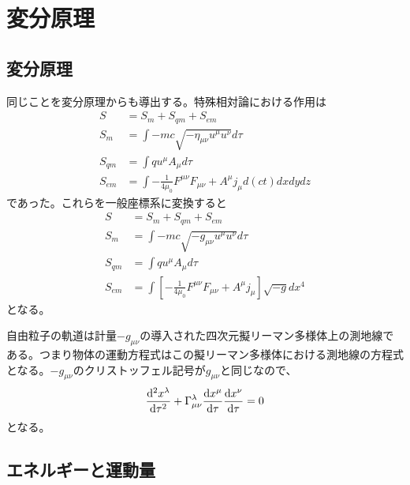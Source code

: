 \section{変分原理}
\subsection{変分原理}
    同じことを変分原理からも導出する。特殊相対論における作用は
    \begin{align*}
        S &= S_m + S_{qm} + S_{em}\\
        S_m    &= \int -mc\sqrt{-\eta_{\mu\nu} u^\mu u^\nu} d\tau\\
        S_{qm} &= \int q u^\mu A_\mu d\tau\\
        S_{em} &= \int -\frac{1}{4\mu_0}F^{\mu\nu}F_{\mu\nu} + A^\mu j_\mu d(ct)dxdydz
    \end{align*}
    であった。これらを一般座標系に変換すると
    \begin{align*}
        S &= S_m + S_{qm} + S_{em}\\
        S_m    &= \int -mc\sqrt{-g_{\mu\nu} u^\mu u^\nu} d\tau\\
        S_{qm} &= \int q u^\mu A_\mu d\tau\\
        S_{em} &= \int \left[-\frac{1}{4\mu_0}F^{\mu\nu}F_{\mu\nu} + A^\mu j_\mu\right] \sqrt{-g}dx^4
    \end{align*}
    となる。

    自由粒子の軌道は計量$-g_{\mu\nu}$の導入された四次元擬リーマン多様体上の測地線である。つまり物体の運動方程式はこの擬リーマン多様体における測地線の方程式となる。$-g_{\mu\nu}$のクリストッフェル記号が$g_{\mu\nu}$と同じなので、
        \[\dv[2]{x^\lambda}{\tau} + \Gamma^\lambda_{\mu\nu}\dv{x^\mu}{\tau}\dv{x^\nu}{\tau} = 0\]
    となる。

\subsection{エネルギーと運動量}


